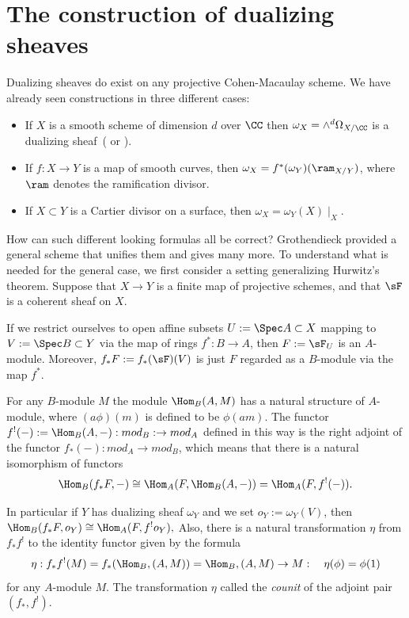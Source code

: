 \section{The construction of dualizing sheaves}\label{dualizing sheaves section}
Dualizing sheaves do exist on any projective Cohen-Macaulay scheme. We have already seen constructions
in three different cases:
\begin{itemize}
 \item If $X$ is a smooth scheme of dimension $d$ over $\CC$ then $\omega_{X}= \wedge^{d} \Omega_{X/\CC}$
is a dualizing sheaf~(\cite[Hartshorne[Section III.7]{Hartshorne1977} or  \cite[p. 648, 708]{Griffiths-Harris1978}). 
\item If $f: X\to Y$ is a map of smooth curves, then $\omega_{X} = f^{*}(\omega_{Y})(\ram_{X/Y})$, where
$\ram$ denotes the ramification divisor.
\item If $X\subset Y$ is a Cartier divisor on a surface, then $\omega_{X} = \omega_{Y}(X)\mid_{X}$.
\end{itemize}

How can such different looking formulas all be correct? Grothendieck provided a general scheme
that unifies them and gives many more. 
To understand what is needed for the general case, we first consider a setting generalizing Hurwitz's theorem.
Suppose that $X\to Y$ is a finite map of projective schemes, and that $\sF$ is a coherent sheaf on $X$.

If we restrict ourselves to open affine subsets
$U := \Spec A\subset X$ mapping to $V:= \Spec B\subset Y$ via the map of rings $f^{*}:B\to A$, then 
$F := \sF_{U}$ is an $A$-module. Moreover,
$f_*{F} := f_*(\sF)(V)$ is just $F$ regarded as a $B$-module via the map $f^{*}$.

For any $B$-module $M$ the module $\Hom_{B}(A, M)$ has a natural structure of $A$-module,
where $(a\phi)(m)$ is defined to be $\phi(am)$. The functor $f^{!}(-) := \Hom_{B}(A, -): mod_{B}:\to mod_{A}$ 
defined in this way is the right adjoint of the functor $f_{*}(-): mod_{A}\to mod_{B}$, 
which means that there is a natural isomorphism of functors
$$
\Hom_{B}(f_{*}F, -) \cong \Hom_{A}(F, \Hom_{B}(A, -)) = \Hom_{A}(F, f^{!}(-)).
$$

In particular if $Y$ has dualizing sheaf $\omega_Y$ and we set $o_Y := \omega_Y(V)$, then
$
\Hom_{B}(f_{*}F, o_{Y}) \cong \Hom_{A}(F, f^{!}o_{Y}),
$
Also, there is a natural transformation $\eta$ from $ f_{*}f^{!}$ to the identity functor given by the formula
$$
\eta: f_{*}f^{!}(M) = f_{*}(\Hom_{B}, (A,M)) = \Hom_{B}, (A,M) \to M:\quad \eta(\phi) = \phi(1)
$$
for any $A$-module $M$. 
The transformation $\eta$ called the \emph{counit} of the adjoint pair $(f_{*}, f^{!})$.

